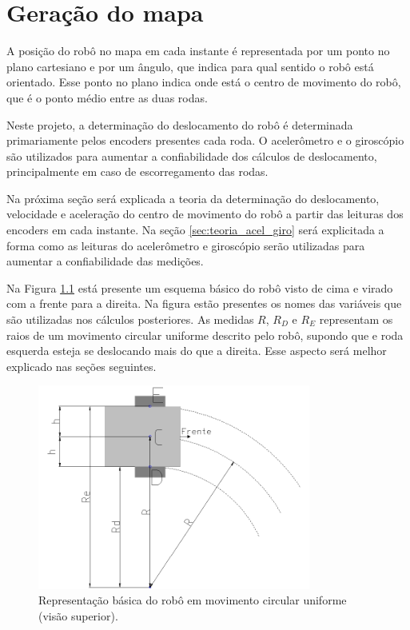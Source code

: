 \chapter{Geração do mapa}

A posição do robô no mapa em cada instante é representada por um ponto no plano cartesiano e por um ângulo, que indica para qual sentido o robô está orientado. Esse ponto no plano indica onde está o centro de movimento do robô, que é o ponto médio entre as duas rodas.

Neste projeto, a determinação do deslocamento do robô é determinada primariamente pelos encoders presentes cada roda. O acelerômetro e o giroscópio são utilizados para aumentar a confiabilidade dos cálculos de deslocamento, principalmente em caso de escorregamento das rodas.

Na próxima seção será explicada a teoria da determinação do deslocamento, velocidade e aceleração do centro de movimento do robô a partir das leituras dos encoders em cada instante. Na seção \ref{sec:teoria_acel_giro} será explicitada a forma como as leituras do acelerômetro e giroscópio serão utilizadas para aumentar a confiabilidade das medições.

Na Figura \ref{fig:robo} está presente um esquema básico do robô visto de cima e virado com a frente para a direita. Na figura estão presentes os nomes das variáveis que são utilizadas nos cálculos posteriores. As medidas $R$, $R_D$ e $R_E$ representam os raios de um movimento circular uniforme descrito pelo robô, supondo que e roda esquerda esteja se deslocando mais do que a direita. Esse aspecto será melhor explicado nas seções seguintes. 

\begin{figure}[H]
  \centering
  \includegraphics[width=0.8\textwidth, keepaspectratio]{./figuras/robo/robo.png}
  \caption{Representação básica do robô em movimento circular uniforme (visão superior).}
  \label{fig:robo}
\end{figure}

